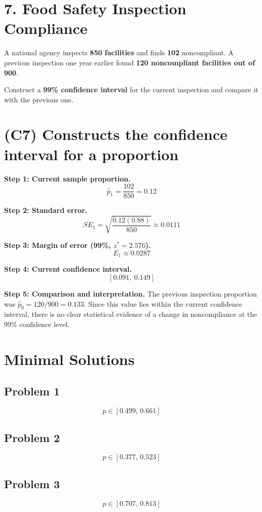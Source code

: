 	\section*{7. Food Safety Inspection Compliance}
	
	A national agency inspects \textbf{850 facilities} and finds \textbf{102} noncompliant. A previous inspection one year earlier found \textbf{120 noncompliant facilities out of 900}.
	
	Construct a \textbf{99\% confidence interval} for the current inspection and compare it with the previous one.
	
	\section{(C7) Constructs the confidence interval for a proportion}
	
	\textbf{Step 1: Current sample proportion.}
	\[
	\hat{p}_1 = \frac{102}{850} = 0.12
	\]
	
	\textbf{Step 2: Standard error.}
	\[
	SE_1 = \sqrt{\frac{0.12(0.88)}{850}} \approx 0.0111
	\]
	
	\textbf{Step 3: Margin of error (99\%, \(z^* = 2.576\)).}
	\[
	E_1 \approx 0.0287
	\]
	
	\textbf{Step 4: Current confidence interval.}
	\[
	[0.091,\ 0.149]
	\]
	
	\textbf{Step 5: Comparison and interpretation.}
	The previous inspection proportion was \(\hat{p}_0 = 120/900 = 0.133\). Since this value lies within the current confidence interval, there is no clear statistical evidence of a change in noncompliance at the 99\% confidence level.
	

\section{Minimal Solutions}
\subsection*{Problem 1}
\[
p \in [0.499,\,0.661]
\]

\subsection*{Problem 2}
\[
p \in [0.377,\,0.523]
\]

\subsection*{Problem 3}
\[
p \in [0.707,\,0.813]
\]

